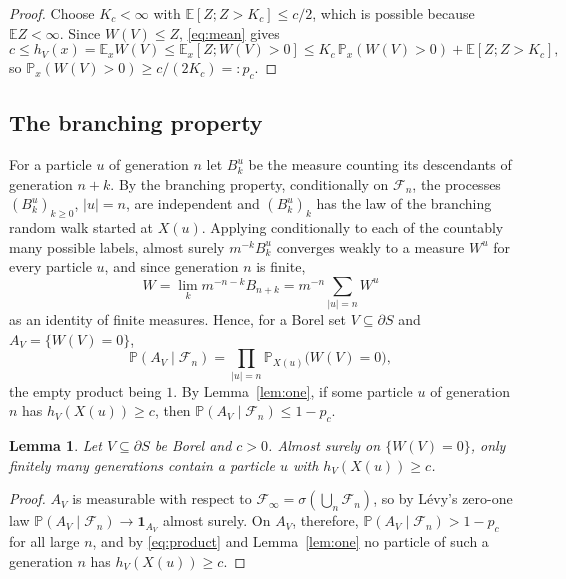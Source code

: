 \documentclass[11pt]{amsart}
\newtheorem{lemma}[theorem]{Lemma}
\theoremstyle{definition}
\theoremstyle{remark}
\numberwithin{equation}{section}
\newcommand{\E}{\mathbb E}
\newcommand{\Pp}{\mathbb P}
\newcommand{\1}{\mathbf 1}
\newcommand{\bd}{\partial S}
\begin{document}
\begin{proof}
Choose $K_c<\infty$ with $\E[Z;Z>K_c]\le c/2$, which is possible because $\E Z<\infty$. Since $W(V)\le Z$, \eqref{eq:mean} gives
\[
c\le h_V(x)=\E_xW(V)\le\E_x[Z;W(V)>0]\le K_c\,\Pp_x(W(V)>0)+\E[Z;Z>K_c],
\]
so $\Pp_x(W(V)>0)\ge c/(2K_c)=:p_c$.
\end{proof}

\subsection{The branching property}
For a particle $u$ of generation $n$ let $B^u_k$ be the measure counting its descendants of generation $n+k$. By the branching property, conditionally on $\mathcal F_n$, the processes $(B^u_k)_{k\ge0}$, $|u|=n$, are independent and $(B^u_k)_k$ has the law of the branching random walk started at $X(u)$. Applying \cite[Theorem~1.1]{CH} conditionally to each of the countably many possible labels, almost surely $m^{-k}B^u_k$ converges weakly to a measure $W^u$ for every particle $u$, and since generation $n$ is finite,
\[
W=\lim_km^{-n-k}B_{n+k}=m^{-n}\sum_{|u|=n}W^u
\]
as an identity of finite measures. Hence, for a Borel set $V\subseteq\bd$ and $A_V=\{W(V)=0\}$,
\begin{equation}\label{eq:product}
\Pp(A_V\mid\mathcal F_n)=\prod_{|u|=n}\Pp_{X(u)}\bigl(W(V)=0\bigr),
\end{equation}
the empty product being $1$. By Lemma~\ref{lem:one}, if some particle $u$ of generation $n$ has $h_V(X(u))\ge c$, then $\Pp(A_V\mid\mathcal F_n)\le1-p_c$.

\begin{lemma}\label{lem:finitely}
Let $V\subseteq\bd$ be Borel and $c>0$. Almost surely on $\{W(V)=0\}$, only finitely many generations contain a particle $u$ with $h_V(X(u))\ge c$.
\end{lemma}

\begin{proof}
$A_V$ is measurable with respect to $\mathcal F_\infty=\sigma(\bigcup_n\mathcal F_n)$, so by L\'evy's zero-one law $\Pp(A_V\mid\mathcal F_n)\to\1_{A_V}$ almost surely. On $A_V$, therefore, $\Pp(A_V\mid\mathcal F_n)>1-p_c$ for all large $n$, and by \eqref{eq:product} and Lemma~\ref{lem:one} no particle of such a generation $n$ has $h_V(X(u))\ge c$.
\end{proof}
\end{document}
